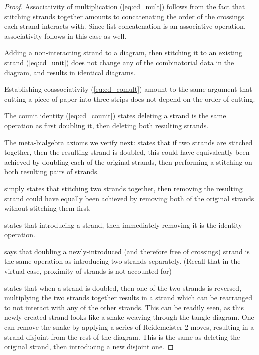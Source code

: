 \documentclass{article}
\begin{document}
\begin{proof}
        Associativity of multiplication (\cref{eq:cd_mult}) follows from the
        fact that stitching strands together amounts to concatenating the order
        of the crossings each strand interacts with. Since list concatenation is
        an associative operation, associativity follows in this case as well.

        Adding a non-interacting strand to a diagram, then stitching it to an
        existing strand (\cref{eq:cd_unit}) does not change any of the
        combinatorial data in the diagram, and results in identical diagrams.

        Establishing coassociativity (\cref{eq:cd_comult}) amount to the same
        argument that cutting a piece of paper into three strips does not depend
        on the order of cutting.

        The counit identity (\cref{eq:cd_counit}) states deleting a strand
        is the same operation as first doubling it, then deleting both resulting
        strands.

        The meta-bialgebra axioms we verify next:
         states that if two strands are stitched
        together, then the resulting strand is doubled, this could have
        equivalently been achieved by doubling each of the original strands,
        then performing a stitching on both resulting pairs of strands.

         simply states that stitching two strands
        together, then removing the resulting strand could have equally been
        achieved by removing both of the original strands without stitching them
        first.

         states that introducing a strand, then
        immediately removing it is the identity operation.

         says that doubling a newly-introduced (and
        therefore free of crossings) strand is the same operation as introducing
        two strands separately. (Recall that in the virtual case, proximity of
        strands is not accounted for)

         states that when a strand is doubled, then one of
        the two strands is reversed, multiplying the two strands together
        results in a strand which can be rearranged to not interact with any of
        the other strands. This can be readily seen, as this newly-created
        strand looks like a snake weaving through the tangle diagram. One can
        remove the snake by applying a series of Reidemeister 2 moves, resulting
        in a strand disjoint from the rest of the diagram. This is the same as
        deleting the original strand, then introducing a new disjoint one.
        

\end{proof}
\end{document}
